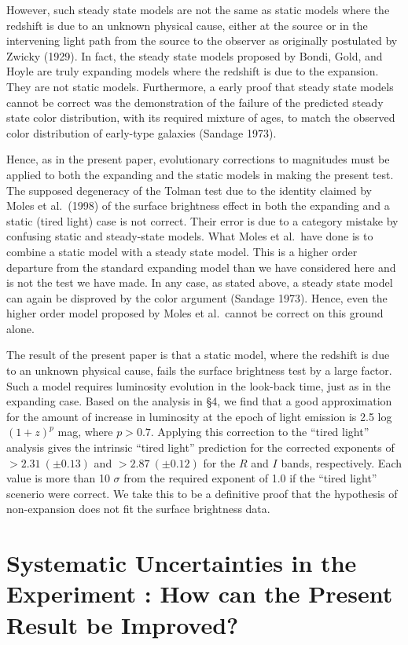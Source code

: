 \documentclass[preprint]{aastex}
\begin{document}
However, such steady state models are not the same as static models
where the redshift is due to an unknown physical cause, either at the
source or in the intervening light path from the source to the
observer as originally postulated by Zwicky (1929). In fact, the
steady state models proposed by Bondi, Gold, and Hoyle are truly
expanding models where the redshift is due to the expansion. They are
not static models.  Furthermore, a early proof that steady state
models cannot be correct was the demonstration of the failure of the
predicted steady state color distribution, with its required mixture
of ages, to match the observed color distribution of early-type
galaxies (Sandage 1973).

Hence, as in the present paper, evolutionary corrections to magnitudes
must be applied to both the expanding and the static models in making
the present test. The supposed degeneracy of the Tolman test due to
the identity claimed by Moles et al.\ (1998) of the surface brightness
effect in both the expanding and a static (tired light) case is not
correct. Their error is due to a category mistake by confusing static
and steady-state models.  What Moles et al.\ have done is to combine a
static model with a steady state model. This is a higher order
departure from the standard expanding model than we have considered
here and is not the test we have made.  In any case, as stated above,
a steady state model can again be disproved by the color argument
(Sandage 1973). Hence, even the higher order model proposed by Moles
et al.\ cannot be correct on this ground alone.
     
The result of the present paper is that a static model, where the
redshift is due to an unknown physical cause, fails the surface
brightness test by a large factor. Such a model requires luminosity
evolution in the look-back time, just as in the expanding case. Based
on the analysis in \S4, we find that a good approximation for the
amount of increase in luminosity at the epoch of light emission is 2.5
log $(1 + z)^p$ mag, where $p > 0.7$.  Applying this correction to the
``tired light'' analysis gives the intrinsic ``tired light''
prediction for the corrected exponents of $> 2.31~(\pm 0.13)$ and
$>2.87~(\pm 0.12)$ for the $R$ and $I$ bands, respectively.  Each
value is more than 10 $\sigma$ from the required exponent of 1.0 if
the ``tired light'' scenerio were correct. We take this to be a
definitive proof that the hypothesis of non-expansion does not fit the
surface brightness data.

\section{Systematic Uncertainties in the Experiment : How can the Present 
Result be Improved?}
\end{document}
